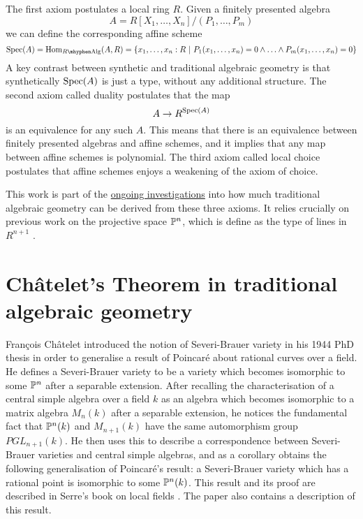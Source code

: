 \documentclass{../util/zariski}
\begin{document}
The first axiom postulates a local ring $R$. Given a finitely presented algebra
\[A = R[X_1,\ldots,X_n]/(P_1,\ldots,P_m)\]
we can define the corresponding affine scheme
\[\Spec(A) = \Hom_{R\mhyphen\mathrm{Alg}}(A,R) = \{x_1,\ldots,x_n:R\ |\ P_1(x_1,\ldots,x_n) = 0 \land\ldots\land P_m(x_1,\ldots,x_n) = 0\}\] 
A key contrast between synthetic and traditional algebraic geometry is that synthetically $\operatorname{Spec}(A)$ is just a type, without any additional structure. The second axiom called duality postulates that the map
\[A\to R^{\operatorname{Spec}(A)}\]
is an equivalence for any such $A$. This means that there is an equivalence between finitely presented algebras and affine schemes, and it implies that any map between affine schemes is polynomial. The third axiom called local choice postulates that affine schemes enjoys a weakening of the axiom of choice.

This work is part of the \href{https://github.com/felixwellen/synthetic-zariski/blob/main/README.md}{ongoing investigations} into how much traditional algebraic geometry can be derived from these three axioms. It relies crucially on previous work on the projective space $\mathbb{P}^n$, which is define as the type of lines in $R^{n+1}$ \cite{sag-projective}.


\section{Ch\^atelet's Theorem in traditional algebraic geometry}

{F}ran\c cois {C}h\^atelet introduced the notion of Severi-Brauer variety in his 1944 PhD thesis
\cite{chatelet44} in order to generalise a result of Poincar\'e about rational curves over a field.
He defines a Severi-Brauer variety to be a variety which becomes isomorphic to some $\mathbb{P}^n$ after
a separable extension. After recalling the characterisation of a central simple algebra over a field $k$ as
an algebra which becomes isomorphic to a matrix algebra $M_n(k)$ after a separable extension, he notices the fundamental
fact that $\mathbb{P}^{n}(k)$ and $M_{n+1}(k)$ have the same automorphism group $PGL_{n+1}(k)$. He then uses this
to describe a correspondence between Severi-Brauer varieties and central simple algebras, and as a corollary
obtains the following generalisation of Poincar\'e's result: a Severi-Brauer variety which has a rational point
is isomorphic to some $\mathbb{P}^{n}(k)$. This result and its proof are described in Serre's book on local fields \cite{serre62}.
The paper \cite{colliot88} also contains a description of this result.
\end{document}
